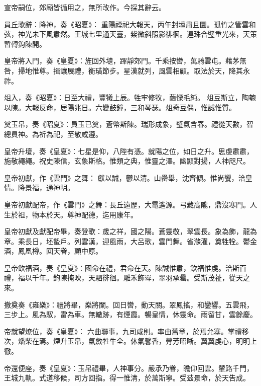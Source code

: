 \begin{pinyinscope}
 宣帝嗣位，郊廟皆循用之，無所改作。今採其辭云。



 員丘歌辭：降神，奏《昭夏》：
 重陽禋祀大報天，丙午封壇肅且圜。孤竹之管雲和弦，神光未下風肅然。王城七里通天臺，紫微斜照影徘徊。連珠合璧重光來，天策暫轉鉤陳開。



 皇帝將入門，奏《皇夏》：旌回外壝，蹕靜郊門。千乘按轡，萬騎雲屯。藉茅無咎，掃地惟尊。揖讓展禮，衡璜節步。星漢就列，風雲相顧。取法於天，降其永祚。



 俎入，奏《昭夏》：日至大禮，豐犧上辰。牲牢修牧，繭慄毛純。
 俎豆斯立，陶匏以陳。大報反命，居陽兆日。六變鼓鐘，三和琴瑟。俎奇豆偶，惟誠惟質。



 奠玉帛，奏《昭夏》：員玉已奠，蒼幣斯陳。瑞形成象，璧氣含春。禮從天數，智總員神。為祈為祀，至敬咸遵。



 皇帝升壇，奏《皇夏》：七星是仰，八陛有憑。就陽之位，如日之升。思虔肅肅，施敬繩繩。祝史陳信，玄象斯格。惟類之典，惟靈之澤。幽顯對揚，人神咫尺。



 皇帝初獻，作《雲門》之舞：
 獻以誠，鬱以清。山罍舉，沈齊傾。惟尚饗，洽皇情。降景福，通神明。



 皇帝初獻配帝，作《雲門》之舞：長丘遠歷，大電遙源。弓藏高隴，鼎沒寒門。人生於祖，物本於天。尊神配德，迄用康年。



 皇帝初獻及獻配帝畢，奏登歌：歲之祥，國之陽。蒼靈敬，翠雲長。象為飾，龍為章。乘長日，坯蟄戶。列雲漢，迎風雨，大呂歌，雲門舞。省滌濯，奠牲牷。鬱金酒，鳳凰樽。回天眷，顧中原。



 皇帝飲福酒，奏《皇夏》：國命在禮，君命在天。陳誠惟肅，欽福惟虔。洽斯百禮，福以千年。鉤陳掩映，天駟徘徊。雕禾飾斝，翠羽承罍。受斯茂祉，從天之來。



 撤奠奏《雍樂》：禮將畢，樂將闌。回日轡，動天關。翠鳳搖，和鑾響。五雲飛，三步上。風為馭，雷為車。無轍跡，有煙霞。暢皇情，休靈命。雨留甘，雲餘慶。



 帝就望燎位，奏《皇夏》：
 六曲聯事，九司咸則。率由舊章，於焉允塞。掌禮移次，燔柴在焉。煙升玉帛，氣斂牲牛全。休氣馨香，膋芳昭晰。翼翼虔心，明明上徹。



 帝還便座，奏《皇夏》：玉帛禮畢，人神事分。嚴承乃眷，瞻仰回雲。輦路千門，王城九軌。式道移候，司方回指。得一惟清，於萬斯寧。受茲景命，於天告成。




\end{pinyinscope}

